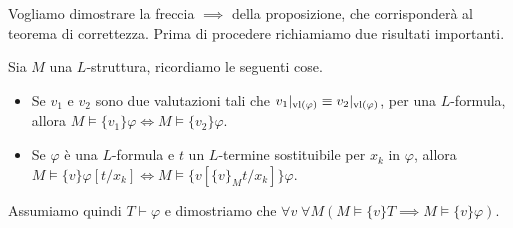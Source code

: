 Vogliamo dimostrare la freccia $\implies$ della proposizione, che corrisponderà al teorema di correttezza. Prima di procedere richiamiamo due risultati importanti.

\begin{remark}
    Sia $M$ una $L$-struttura, ricordiamo le seguenti cose.
    \begin{itemize}
        \item Se $v_1$ e $v_2$ sono due valutazioni tali che $v_1|_{\operatorname{vl}(\varphi)} \equiv v_2|_{\operatorname{vl}(\varphi)}$, per una $L$-formula, allora $M \models \{v_1\}\varphi \iff M \models \{v_2\}\varphi$.
        \item Se $\varphi$ è una $L$-formula e $t$ un $L$-termine sostituibile per $x_k$ in $\varphi$, allora $M \models \{v\}\varphi[t/x_k] \iff M \models \{v[\{v\}_M t/x_k]\}\varphi$.
    \end{itemize}
\end{remark}

Assumiamo quindi $T \vdash \varphi$ e dimostriamo che $\forall v \; \forall M (M \models \{v\}T \implies M \models \{v\}\varphi)$.

